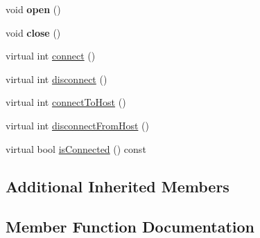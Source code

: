 \begin{DoxyCompactItemize}
\item 
\mbox{\label{classwood_box_1_1communication_1_1wifi_1_1_e_s_p8266_wi_fi_communicator_a8bf593dd2b78572988c240b57cc9c5c8}} 
void {\bfseries open} ()
\item 
\mbox{\label{classwood_box_1_1communication_1_1wifi_1_1_e_s_p8266_wi_fi_communicator_ae8188b06891b3fd0e21312b3e69910d4}} 
void {\bfseries close} ()
\item 
virtual int \mbox{\hyperlink{classwood_box_1_1communication_1_1wifi_1_1_e_s_p8266_wi_fi_communicator_ab3e1f12a851dc3ed6eb487c39178cb6f}{connect}} ()
\item 
virtual int \mbox{\hyperlink{classwood_box_1_1communication_1_1wifi_1_1_e_s_p8266_wi_fi_communicator_af30a81a7f279c11241b3df0878289af0}{disconnect}} ()
\item 
virtual int \mbox{\hyperlink{classwood_box_1_1communication_1_1wifi_1_1_e_s_p8266_wi_fi_communicator_a0875cf7209c48069d22270eaeb2cac0f}{connect\+To\+Host}} ()
\item 
virtual int \mbox{\hyperlink{classwood_box_1_1communication_1_1wifi_1_1_e_s_p8266_wi_fi_communicator_a5a407734df1ae47ac32575fa6346cfd4}{disconnect\+From\+Host}} ()
\item 
virtual bool \mbox{\hyperlink{classwood_box_1_1communication_1_1wifi_1_1_e_s_p8266_wi_fi_communicator_a2a1d8b14bca4b6964f043b874d23090c}{is\+Connected}} () const
\end{DoxyCompactItemize}
\subsection*{Additional Inherited Members}


\subsection{Member Function Documentation}
\mbox{\label{classwood_box_1_1communication_1_1wifi_1_1_e_s_p8266_wi_fi_communicator_aa73f46aaaf5441b79dd4a15be293aeb4}} 
